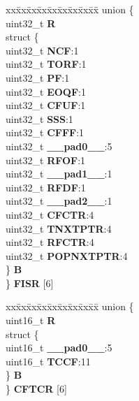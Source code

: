 \begin{DoxyCompactItemize}
\begin{tabbing}
\end{tabbing}\item 
\mbox{\label{structEQADC__tag_a17f04c3db13e26f7a512c1ccdbffb8cc}} 
\begin{tabbing}
xx\=xx\=xx\=xx\=xx\=xx\=xx\=xx\=xx\=\kill
union \{\\
\>uint32\_t {\bfseries R}\\
\>struct \{\\
\>\>uint32\_t {\bfseries NCF}:1\\
\>\>uint32\_t {\bfseries TORF}:1\\
\>\>uint32\_t {\bfseries PF}:1\\
\>\>uint32\_t {\bfseries EOQF}:1\\
\>\>uint32\_t {\bfseries CFUF}:1\\
\>\>uint32\_t {\bfseries SSS}:1\\
\>\>uint32\_t {\bfseries CFFF}:1\\
\>\>uint32\_t {\bfseries \_\_pad0\_\_}:5\\
\>\>uint32\_t {\bfseries RFOF}:1\\
\>\>uint32\_t {\bfseries \_\_pad1\_\_}:1\\
\>\>uint32\_t {\bfseries RFDF}:1\\
\>\>uint32\_t {\bfseries \_\_pad2\_\_}:1\\
\>\>uint32\_t {\bfseries CFCTR}:4\\
\>\>uint32\_t {\bfseries TNXTPTR}:4\\
\>\>uint32\_t {\bfseries RFCTR}:4\\
\>\>uint32\_t {\bfseries POPNXTPTR}:4\\
\>\} {\bfseries B}\\
\} {\bfseries FISR} \mbox{[}6\mbox{]}\\

\end{tabbing}\item 
\mbox{\label{structEQADC__tag_a79783927e195d3ca0980083a9b991aa1}} 
\begin{tabbing}
xx\=xx\=xx\=xx\=xx\=xx\=xx\=xx\=xx\=\kill
union \{\\
\>uint16\_t {\bfseries R}\\
\>struct \{\\
\>\>uint16\_t {\bfseries \_\_pad0\_\_}:5\\
\>\>uint16\_t {\bfseries TCCF}:11\\
\>\} {\bfseries B}\\
\} {\bfseries CFTCR} \mbox{[}6\mbox{]}\\


\end{tabbing}
\end{DoxyCompactItemize}
